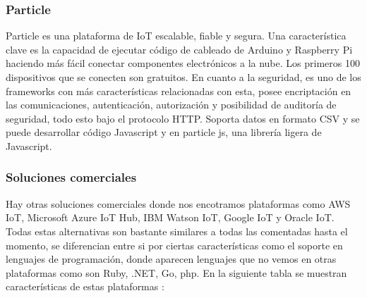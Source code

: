 {\subsubsection{Particle}

Particle es una plataforma de IoT escalable, fiable y segura. Una característica clave es la capacidad de ejecutar código de cableado de Arduino y Raspberry Pi haciendo más fácil conectar componentes electrónicos a la nube. Los primeros 100 dispositivos que se conecten son gratuitos. En cuanto a la seguridad, es uno de los frameworks con más características relacionadas con esta, posee encriptación en las comunicaciones, autenticación, autorización y posibilidad de auditoría de seguridad, todo esto bajo el protocolo HTTP. Soporta datos en formato CSV y se puede desarrollar código Javascript y en particle js, una librería ligera de Javascript.

\subsubsection{Soluciones comerciales}

Hay otras soluciones comerciales donde nos encotramos plataformas como AWS IoT, Microsoft Azure IoT Hub, IBM Watson IoT, Google IoT y Oracle IoT. Todas estas alternativas son bastante similares a todas las comentadas hasta el momento, se diferencian entre si por ciertas características como el soporte en lenguajes de programación, donde aparecen lenguajes que no vemos en otras plataformas como son Ruby, .NET, Go, php. En la siguiente tabla se muestran características de estas plataformas : 


}
